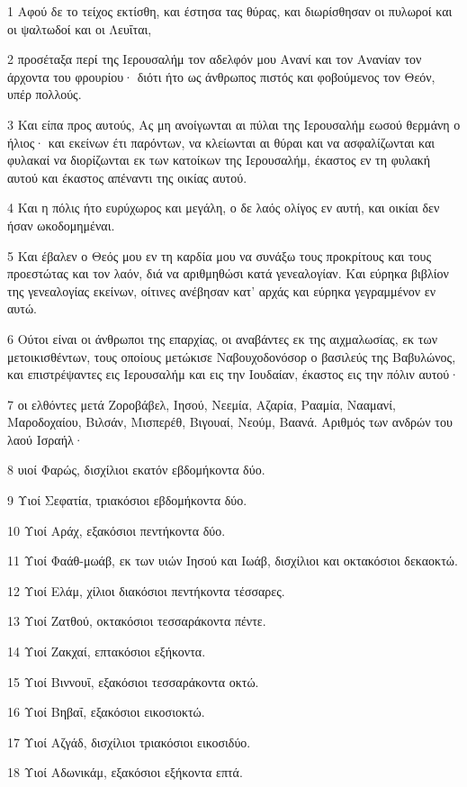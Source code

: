 \par 1 Αφού δε το τείχος εκτίσθη, και έστησα τας θύρας, και διωρίσθησαν οι πυλωροί και οι ψαλτωδοί και οι Λευΐται,
\par 2 προσέταξα περί της Ιερουσαλήμ τον αδελφόν μου Ανανί και τον Ανανίαν τον άρχοντα του φρουρίου· διότι ήτο ως άνθρωπος πιστός και φοβούμενος τον Θεόν, υπέρ πολλούς.
\par 3 Και είπα προς αυτούς, Ας μη ανοίγωνται αι πύλαι της Ιερουσαλήμ εωσού θερμάνη ο ήλιος· και εκείνων έτι παρόντων, να κλείωνται αι θύραι και να ασφαλίζωνται και φυλακαί να διορίζωνται εκ των κατοίκων της Ιερουσαλήμ, έκαστος εν τη φυλακή αυτού και έκαστος απέναντι της οικίας αυτού.
\par 4 Και η πόλις ήτο ευρύχωρος και μεγάλη, ο δε λαός ολίγος εν αυτή, και οικίαι δεν ήσαν ωκοδομημέναι.
\par 5 Και έβαλεν ο Θεός μου εν τη καρδία μου να συνάξω τους προκρίτους και τους προεστώτας και τον λαόν, διά να αριθμηθώσι κατά γενεαλογίαν. Και εύρηκα βιβλίον της γενεαλογίας εκείνων, οίτινες ανέβησαν κατ' αρχάς και εύρηκα γεγραμμένον εν αυτώ.
\par 6 Ούτοι είναι οι άνθρωποι της επαρχίας, οι αναβάντες εκ της αιχμαλωσίας, εκ των μετοικισθέντων, τους οποίους μετώκισε Ναβουχοδονόσορ ο βασιλεύς της Βαβυλώνος, και επιστρέψαντες εις Ιερουσαλήμ και εις την Ιουδαίαν, έκαστος εις την πόλιν αυτού·
\par 7 οι ελθόντες μετά Ζοροβάβελ, Ιησού, Νεεμία, Αζαρία, Ρααμία, Νααμανί, Μαροδοχαίου, Βιλσάν, Μισπερέθ, Βιγουαί, Νεούμ, Βαανά. Αριθμός των ανδρών του λαού Ισραήλ·
\par 8 υιοί Φαρώς, δισχίλιοι εκατόν εβδομήκοντα δύο.
\par 9 Υιοί Σεφατία, τριακόσιοι εβδομήκοντα δύο.
\par 10 Υιοί Αράχ, εξακόσιοι πεντήκοντα δύο.
\par 11 Υιοί Φαάθ-μωάβ, εκ των υιών Ιησού και Ιωάβ, δισχίλιοι και οκτακόσιοι δεκαοκτώ.
\par 12 Υιοί Ελάμ, χίλιοι διακόσιοι πεντήκοντα τέσσαρες.
\par 13 Υιοί Ζατθού, οκτακόσιοι τεσσαράκοντα πέντε.
\par 14 Υιοί Ζακχαί, επτακόσιοι εξήκοντα.
\par 15 Υιοί Βιννουΐ, εξακόσιοι τεσσαράκοντα οκτώ.
\par 16 Υιοί Βηβαΐ, εξακόσιοι εικοσιοκτώ.
\par 17 Υιοί Αζγάδ, δισχίλιοι τριακόσιοι εικοσιδύο.
\par 18 Υιοί Αδωνικάμ, εξακόσιοι εξήκοντα επτά.
